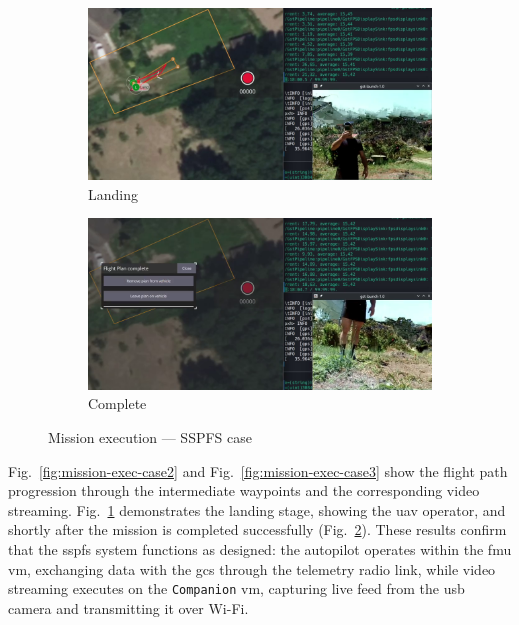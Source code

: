 \begin{figure}[!hbt]
  \begin{subfigure}[t]{0.49\textwidth}
    \centering
    \includegraphics[width=\linewidth]{./img/png/bao-fpv-land-annot} 
    \caption{Landing}%
    \label{fig:mission-exec-case4}
  \end{subfigure}
  \hfill
  \begin{subfigure}[t]{0.49\textwidth}
    \centering
    \includegraphics[width=\linewidth]{./img/png/bao-fpv-complete-annot} 
    \caption{Complete}%
    \label{fig:mission-exec-case5}
  \end{subfigure}
  
  \caption{Mission execution — SSPFS case}
  \label{fig:mission-exec-sspfs}
\end{figure}

Fig.~\ref{fig:mission-exec-case2} and Fig.~\ref{fig:mission-exec-case3}
show the flight path progression through the intermediate waypoints and the
corresponding video streaming.
Fig.~\ref{fig:mission-exec-case4} demonstrates the landing stage, showing the
\gls{uav} operator, and shortly after the mission is completed successfully
(Fig.~\ref{fig:mission-exec-case5}).
%
These results confirm that the \gls{sspfs} system functions as designed: the
autopilot operates within the \gls{fmu} \gls{vm}, exchanging data with the
\gls{gcs} through the telemetry radio link, while video streaming executes on
the \lstinline{Companion} \gls{vm}, capturing live feed from the \gls{usb} camera and transmitting it over Wi-Fi.

